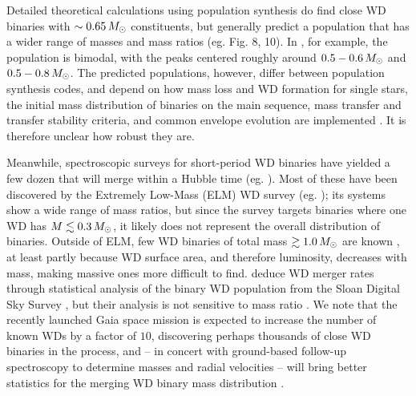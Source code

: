 
Detailed theoretical calculations using population synthesis do find close WD binaries with $\sim0.65\,\Msun$ constituents, but generally predict a population that has a wider range of masses and mass ratios (eg. \citealt{toon+14} Fig. 8, 10).  In \cite{toonnp12}, for example, the population is bimodal, with the peaks centered roughly around $0.5-0.6\,\Msun$ and $0.5-0.8\,\Msun$.  The predicted populations, however, differ between population synthesis codes, and depend on how mass loss and WD formation for single stars, the initial mass distribution of binaries on the main sequence, mass transfer and transfer stability criteria, and common envelope evolution are implemented \citep{toon+14, clae+14}.  It is therefore unclear how robust they are.

Meanwhile, spectroscopic surveys for short-period WD binaries have yielded a few dozen that will merge within a Hubble time (eg. \citealt{mars11, gian+15}).  Most of these have been discovered by the Extremely Low-Mass (ELM) WD survey (eg. \citealt{brow+10, gian+15}); its systems show a wide range of mass ratios, but since the survey targets binaries where one WD has $M\lesssim 0.3\,\Msun$, it likely does not represent the overall distribution of binaries.  Outside of ELM, few WD binaries of total mass $\gtrsim1.0\,\Msun$ are known \citep{napi+07, mars11}, at least partly because WD surface area, and therefore luminosity, decreases with mass, making massive ones more difficult to find.  \cite{badem12} deduce WD merger rates through statistical analysis of the binary WD population from the Sloan Digital Sky Survey \citep{york+00}, but their analysis is not sensitive to mass ratio \citep{maozbb12}.  We note that the recently launched Gaia space mission \citep{carr+14} is expected to increase the number of known WDs by a factor of $10$, discovering perhaps thousands of close WD binaries in the process, and -- in concert with ground-based follow-up spectroscopy to determine masses and radial velocities -- will bring better statistics for the merging WD binary mass distribution \citep{gaen+15}.


